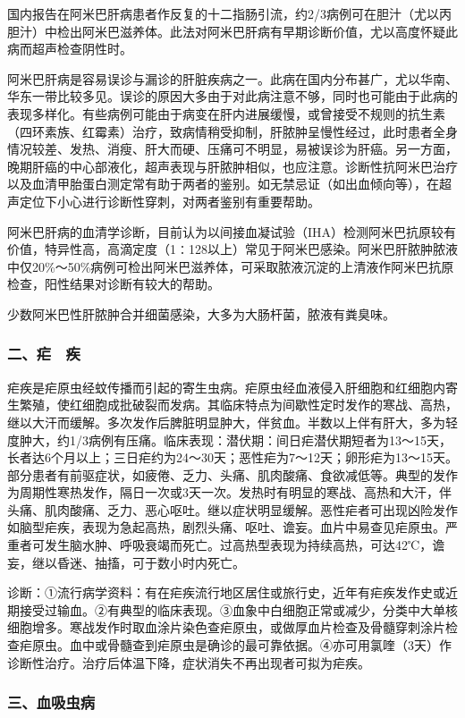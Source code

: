 国内报告在阿米巴肝病患者作反复的十二指肠引流，约2/3病例可在胆汁（尤以丙胆汁）中检出阿米巴滋养体。此法对阿米巴肝病有早期诊断价值，尤以高度怀疑此病而超声检查阴性时。

阿米巴肝病是容易误诊与漏诊的肝脏疾病之一。此病在国内分布甚广，尤以华南、华东一带比较多见。误诊的原因大多由于对此病注意不够，同时也可能由于此病的表现多样化。有些病例可能由于病变在肝内进展缓慢，或曾接受不规则的抗生素（四环素族、红霉素）治疗，致病情稍受抑制，肝脓肿呈慢性经过，此时患者全身情况较差、发热、消瘦、肝大而硬、压痛可不明显，易被误诊为肝癌。另一方面，晚期肝癌的中心部液化，超声表现与肝脓肿相似，也应注意。诊断性抗阿米巴治疗以及血清甲胎蛋白测定常有助于两者的鉴别。如无禁忌证（如出血倾向等），在超声定位下小心进行诊断性穿刺，对两者鉴别有重要帮助。

阿米巴肝病的血清学诊断，目前认为以间接血凝试验（IHA）检测阿米巴抗原较有价值，特异性高，高滴定度（1∶128以上）常见于阿米巴感染。阿米巴肝脓肿脓液中仅20\%～50\%病例可检出阿米巴滋养体，可采取脓液沉淀的上清液作阿米巴抗原检查，阳性结果对诊断有较大的帮助。

少数阿米巴性肝脓肿合并细菌感染，大多为大肠杆菌，脓液有粪臭味。

\subsubsection{二、疟　疾}

疟疾是疟原虫经蚊传播而引起的寄生虫病。疟原虫经血液侵入肝细胞和红细胞内寄生繁殖，使红细胞成批破裂而发病。其临床特点为间歇性定时发作的寒战、高热，继以大汗而缓解。多次发作后脾脏明显肿大，伴贫血。半数以上伴有肝大，多为轻度肿大，约1/3病例有压痛。临床表现：潜伏期：间日疟潜伏期短者为13～15天，长者达6个月以上；三日疟约为24～30天；恶性疟为7～12天；卵形疟为13～15天。部分患者有前驱症状，如疲倦、乏力、头痛、肌肉酸痛、食欲减低等。典型的发作为周期性寒热发作，隔日一次或3天一次。发热时有明显的寒战、高热和大汗，伴头痛、肌肉酸痛、乏力、恶心呕吐。继以症状明显缓解。恶性疟者可出现凶险发作如脑型疟疾，表现为急起高热，剧烈头痛、呕吐、谵妄。血片中易查见疟原虫。严重者可发生脑水肿、呼吸衰竭而死亡。过高热型表现为持续高热，可达42℃，谵妄，继以昏迷、抽搐，可于数小时内死亡。

诊断：①流行病学资料：有在疟疾流行地区居住或旅行史，近年有疟疾发作史或近期接受过输血。②有典型的临床表现。③血象中白细胞正常或减少，分类中大单核细胞增多。寒战发作时取血涂片染色查疟原虫，或做厚血片检查及骨髓穿刺涂片检查疟原虫。血中或骨髓查到疟原虫是确诊的最可靠依据。④亦可用氯喹（3天）作诊断性治疗。治疗后体温下降，症状消失不再出现者可拟为疟疾。

\subsubsection{三、血吸虫病}

